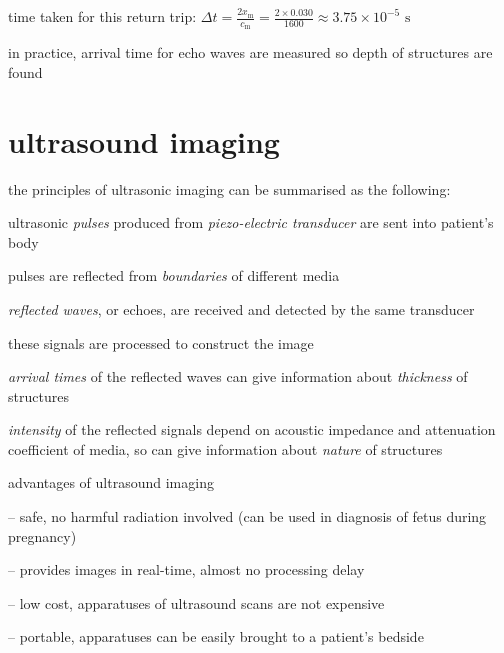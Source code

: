 time taken for this return trip: $\Delta t = \frac{2x_\text{m}}{c_\text{m}} = \frac{2\times0.030}{1600} \approx 3.75\times10^{-5} \text{ s}$ 

in practice, arrival time for echo waves are measured so depth of structures are found \eoe






\section{ultrasound imaging}

the principles of ultrasonic imaging can be summarised as the following:

ultrasonic \emph{pulses} produced from \emph{piezo-electric transducer} are sent into patient’s body

pulses are reflected from \emph{boundaries} of different media

\emph{reflected waves}, or echoes, are received and detected by the same transducer

these signals are processed to construct the image

\emph{arrival times} of the reflected waves can give information about \emph{thickness} of structures

\emph{intensity} of the reflected signals depend on acoustic impedance and attenuation coefficient of media, so can give information about \emph{nature} of structures


\cmt advantages of ultrasound imaging

\begin{compactitem}
	\item[--] safe, no harmful radiation involved (can be used in diagnosis of fetus during pregnancy)
	
	\item[--] provides images in real-time, almost no processing delay
	
	\item[--] low cost, apparatuses of ultrasound scans are not expensive
	
	\item[--] portable, apparatuses can be easily brought to a patient's bedside
\end{compactitem}
	
